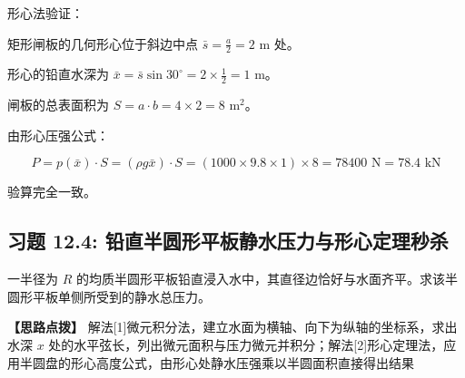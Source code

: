 \documentclass[11pt,a4paper,UTF8]{ctexart}
\begin{document}
\begin{solbox}[分步推导与答题规范]
形心法验证：

矩形闸板的几何形心位于斜边中点 $\bar{s} = \frac{a}{2} = 2\text{ m}$ 处。

形心的铅直水深为 $\bar{x} = \bar{s}\sin 30^\circ = 2 \times \frac{1}{2} = 1\text{ m}$。

闸板的总表面积为 $S = a \cdot b = 4 \times 2 = 8\text{ m}^2$。

由形心压强公式：


\begin{equation*}
P = p(\bar{x}) \cdot S = (\rho g \bar{x}) \cdot S = (1000 \times 9.8 \times 1) \times 8 = 78400\text{ N} = 78.4\text{ kN}
\end{equation*}


验算完全一致。
\end{solbox}


\subsection{习题 12.4: 铅直半圆形平板静水压力与形心定理秒杀}

一半径为 $R$ 的均质半圆形平板铅直浸入水中，其直径边恰好与水面齐平。求该半圆形平板单侧所受到的静水总压力。

\textbf{\color{DeepPurple}【思路点拨】} 解法[1]微元积分法，建立水面为横轴、向下为纵轴的坐标系，求出水深 $x$ 处的水平弦长，列出微元面积与压力微元并积分；解法[2]形心定理法，应用半圆盘的形心高度公式，由形心处静水压强乘以半圆面积直接得出结果
\end{document}
